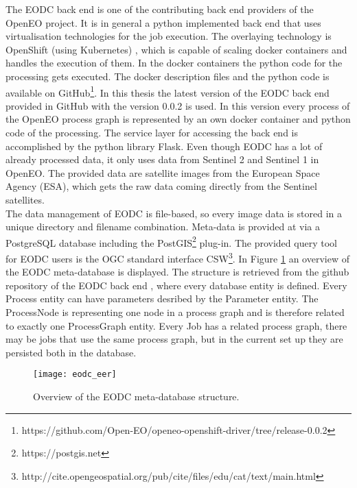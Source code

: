 \documentclass[draft,final]{vutinfth} %
\begin{document}
The EODC back end is one of the contributing back end providers of the OpenEO project. It is in general a python implemented back end that uses virtualisation technologies for the job execution. The overlaying technology is OpenShift (using Kubernetes) \cite{openshift}, which is capable of scaling docker containers and handles the execution of them. In the docker containers the python code for the processing gets executed. The docker description files and the python code is available on GitHub\footnote{https://github.com/Open-EO/openeo-openshift-driver/tree/release-0.0.2}. In this thesis the latest version of the EODC back end provided in GitHub with the version 0.0.2 is used. In this version every process of the OpenEO process graph is represented by an own docker container and python code of the processing. The service layer for accessing the back end is accomplished by the python library Flask. Even though EODC has a lot of already processed data, it only uses data from Sentinel 2 and Sentinel 1 in OpenEO. The provided data are satellite images from the European Space Agency (ESA), which gets the raw data coming directly from the Sentinel satellites. \\
The data management of EODC is file-based, so every image data is stored in a unique directory and filename combination. Meta-data is provided at via a PostgreSQL database including the PostGIS\footnote{https://postgis.net} plug-in. The provided query tool for EODC users is the OGC standard interface CSW\footnote{http://cite.opengeospatial.org/pub/cite/files/edu/cat/text/main.html}. In Figure \ref{fig:eodceer} an overview of the EODC meta-database is displayed. The structure is retrieved from the github repository of the EODC back end \cite{eodc_github}, where every database entity is defined. Every Process entity can have parameters desribed by the Parameter entity. The ProcessNode is representing one node in a process graph and is therefore related to exactly one ProcessGraph entity. Every Job has a related process graph, there may be jobs that use the same process graph, but in the current set up they are persisted both in the database.

\begin{figure}[h]
	\centering
	\texttt{[image: eodc\_eer]}
	\caption{Overview of the EODC meta-database structure.}
	\label{fig:eodceer} %
\end{figure}
\end{document}
